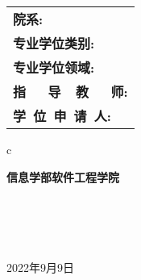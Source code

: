 \begin{center}
	\renewcommand\arraystretch{1.5}
	\begin{tabular}{l}
		{\sihao \bf 院\qquad\qquad 系:} \\
		{\sihao \bf 专业学位类别:}      \\
		{\sihao \bf 专业学位领域:}      \\
		{\sihao \bf 指~~~导~~教~~~师:}      \\
		{\sihao \bf 学~位~申~请~人:}
	\end{tabular}
	\begin{tabular}c

		{\sihao \bf  \qquad 信息学部软件工程学院 \qquad} \\
		                  \\
		                 \\
		                     \\
		                     \\


		\hline
	\end{tabular}
\end{center}

\vskip 2.0cm

\begin{center}
	{\sihao 2022年9月9日}
\end{center}
